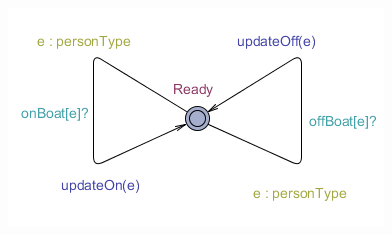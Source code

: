 \begin{figure}%
\includegraphics[width=\columnwidth]{pictures/observer.png}%
\caption{}%
\label{fig:observer}%
\end{figure}


